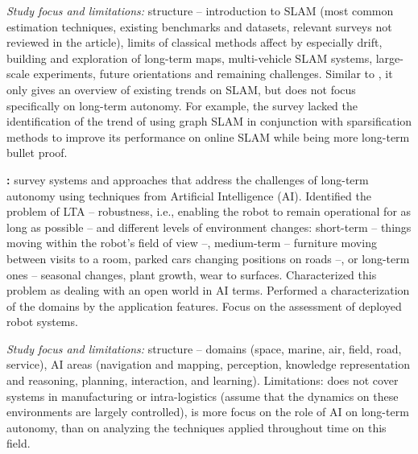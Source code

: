 \documentclass[10pt,a4paper,notitlepage,twocolumn,oneside]{article}
\begin{document}
\textit{Study focus and limitations:} structure -- introduction to SLAM (most common estimation techniques, existing benchmarks and datasets, relevant surveys not reviewed in the article), limits of classical methods affect by especially drift, building and exploration of long-term maps, multi-vehicle SLAM systems, large-scale experiments, future orientations and remaining challenges. Similar to \cite{review:cadena:2016}, it only gives an overview of existing trends on SLAM, but does not focus specifically on long-term autonomy. For example, the survey lacked the identification of the trend of using graph SLAM in conjunction with sparsification methods to improve its performance on online SLAM while being more long-term bullet proof.

\textbf{\cite{review:kunze:2018}:} survey systems and approaches that address the challenges of long-term autonomy using techniques from Artificial Intelligence (AI). Identified the problem of LTA -- robustness, i.e., enabling the robot to remain operational for as long as possible -- and different levels of environment changes: short-term -- things moving within the robot's field of view --, medium-term -- furniture moving between visits to a room, parked cars changing positions on roads --, or long-term ones -- seasonal changes, plant growth, wear to surfaces. Characterized this problem as dealing with an open world in AI terms. Performed a characterization of the domains by the application features. Focus on the assessment of deployed robot systems.

\textit{Study focus and limitations:} structure -- domains (space, marine, air, field, road, service), AI areas (navigation and mapping, perception, knowledge representation and reasoning, planning, interaction, and learning). Limitations: does not cover systems in manufacturing or intra-logistics (assume that the dynamics on these environments are largely controlled), is more focus on the role of AI on long-term autonomy, than on analyzing the techniques applied throughout time on this field.
\end{document}
